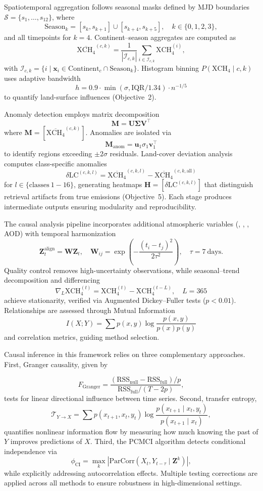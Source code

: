 Spatiotemporal aggregation follows seasonal masks defined by MJD boundaries $\mathcal{S} = \{s_1, \dots, s_{12}\}$, where  
\[
\mathrm{Season}_k = [s_k, s_{k+1}] \cup [s_{k+4}, s_{k+5}], \quad k \in \{0,1,2,3\},
\]  
and all timepoints for $k=4$. Continent–season aggregates are computed as  
\[
\overline{\mathrm{XCH}_4}^{(c,k)} = \frac{1}{|\mathcal{I}_{c,k}|} \sum_{i \in \mathcal{I}_{c,k}} \mathrm{XCH}_4^{(i)},
\]  
with $\mathcal{I}_{c,k} = \{ i \mid \mathbf{x}_i \in \mathrm{Continent}_c \cap \mathrm{Season}_k \}$. Histogram binning $P(\mathrm{XCH}_4 \mid c,k)$ uses adaptive bandwidth  
\[
h = 0.9 \cdot \min(\sigma, \mathrm{IQR}/1.34) \cdot n^{-1/5}
\]  
to quantify land-surface influences (Objective~2).  

Anomaly detection employs matrix decomposition  
\[
\mathbf{M} = \mathbf{U} \mathbf{\Sigma} \mathbf{V}^\top
\]  
where $\mathbf{M} = [\overline{\mathrm{XCH}_4}^{(c,k)}]$. Anomalies are isolated via  
\[
\mathbf{M}_{\mathrm{anom}} = \mathbf{u}_1 \sigma_1 \mathbf{v}_1^\top
\]  
to identify regions exceeding $\pm 2\sigma$ residuals. Land-cover deviation analysis computes class-specific anomalies  
\[
\delta\mathrm{LC}^{(c,k,l)} = \overline{\mathrm{XCH}_4}^{(c,k,l)} - \overline{\mathrm{XCH}_4}^{(c,k,\mathrm{all})}
\]  
for $l \in \{\mathrm{classes\ 1\!-\!16}\}$, generating heatmaps $\mathbf{H} = [\delta\mathrm{LC}^{(c,k,l)}]$ that distinguish retrieval artifacts from true emissions (Objective~5). Each stage produces intermediate outputs ensuring modularity and reproducibility.  

The causal analysis pipeline incorporates additional atmospheric variables (, , , AOD) with temporal harmonization  
\[
\mathbf{Z}_t^{\mathrm{align}} = \mathbf{W} \mathbf{Z}_t, \quad \mathbf{W}_{ij} = \exp\!\left( -\frac{(t_i - t_j)^2}{2\tau^2} \right), \quad \tau = 7\ \mathrm{days}.
\]  
Quality control removes high-uncertainty observations, while seasonal–trend decomposition and differencing  
\[
\nabla_L \mathrm{XCH}_4^{(t)} = \mathrm{XCH}_4^{(t)} - \mathrm{XCH}_4^{(t-L)}, \quad L=365
\]  
achieve stationarity, verified via Augmented Dickey–Fuller tests ($p<0.01$). Relationships are assessed through Mutual Information  
\[
I(X;Y) = \sum p(x,y) \log \frac{p(x,y)}{p(x)p(y)}
\]  
and correlation metrics, guiding method selection.  


Causal inference in this framework relies on three complementary approaches. First, Granger causality, given by 

\[
F_{\mathrm{Granger}} = \frac{(\mathrm{RSS}_{\mathrm{null}} - \mathrm{RSS}_{\mathrm{full}})/p}{\mathrm{RSS}_{\mathrm{full}}/(T - 2p)},
\]  
tests for linear directional influence between time series. Second, transfer entropy,  
\[
\mathcal{T}_{Y \to X} = \sum p(x_{t+1},x_t,y_t) \log \frac{p(x_{t+1} \mid x_t, y_t)}{p(x_{t+1} \mid x_t)},
\]  
quantifies nonlinear information flow by measuring how much knowing the past of $Y$ improves predictions of $X$. Third, the PCMCI algorithm detects conditional independence via  
\[
\phi_{\mathrm{CI}} = \max_k |\mathrm{ParCorr}(X_t, Y_{t-\tau} \mid \mathbf{Z}^k)|,
\]  
while explicitly addressing autocorrelation effects. Multiple testing corrections are applied across all methods to ensure robustness in high-dimensional settings.

